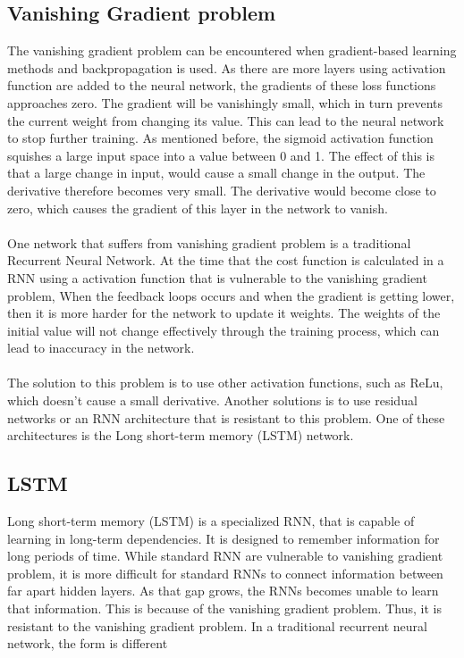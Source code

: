 \subsection{Vanishing Gradient problem}
The vanishing gradient problem can be encountered when gradient-based learning methods and backpropagation is used. As there are more layers using activation function are added to the neural network, the gradients of these loss functions approaches zero. The gradient will be vanishingly small, which in turn prevents the current weight from changing its value. This can lead to the neural network to stop further training. As mentioned before, the sigmoid activation function squishes a large input space into a value between 0 and 1. The effect of this is that a large change in input, would cause a small change in the output. The derivative therefore becomes very small. The derivative would become close to zero, which causes the gradient of this layer in the network to vanish.\\\\
One network that suffers from vanishing gradient problem is a traditional Recurrent Neural Network. At the time that the cost function is calculated in a RNN using a activation function that is vulnerable to the vanishing gradient problem, When the feedback loops occurs and when the gradient is getting lower, then it is more harder for the network to update it weights. The weights of the initial value will not change effectively through the training process, which can lead to inaccuracy in the network. \\\\
The solution to this problem is to use other activation functions, such as ReLu, which doesn't cause a small derivative. Another solutions is to use residual networks \cite{DBLP:journals/corr/HeZRS15} or an RNN architecture that is resistant to this problem. One of these architectures is the Long short-term memory (LSTM) network. 

\subsection{LSTM}
Long short-term memory (LSTM) is a specialized RNN, that is capable of learning in long-term dependencies. It is designed to remember information for long periods of time. While standard RNN are vulnerable to vanishing gradient problem, it is more difficult for standard RNNs to connect information between far apart hidden layers. As that gap grows, the RNNs becomes unable to learn that information. This is because of the vanishing gradient problem. Thus, it is resistant to the vanishing gradient problem. In a traditional recurrent neural network, the form is different

